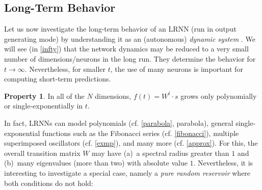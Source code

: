 \documentclass{sn-jnl}
\theoremstyle{definition}
\newtheorem{prop}{Property}
\begin{document}

\subsection{Long-Term Behavior}\label{ellipse}

Let us now investigate the long-term behavior of an LRNN (run in output generating
mode) by understanding it as an (autonomous) \emph{dynamic system} \citep{CK14,Str15}.
We will see (in \cref{infty}) that the network dynamics may be reduced to a
very small number of dimensions/neurons in the long run. They determine the behavior for $t
\to \infty$. Nevertheless, for smaller $t$, the use of many neurons is important
for computing short-term predictions.

\begin{prop}\label{exponential}
In all of the $N$ dimensions, $f(t) = W^t \cdot s$ grows only polynomially or
single-exponentially in $t$.
\end{prop}


In fact, LRNNs can model polynomials (cf. \cref{parabola}, parabola), general
single-exponential functions such as the Fibonacci series (cf. \cref{fibonacci}),
multiple superimposed oscillators (cf. \cref{exmp}), and many more (cf.
\cref{approx}). For this, the overall transition matrix $W$ may have (a)~a
spectral radius greater than $1$ and (b)~many eigenvalues (more than two) with
absolute value $1$. Nevertheless, it is interesting to investigate a special
case, namely a \emph{pure random reservoir} where both conditions do not hold:
\end{document}
